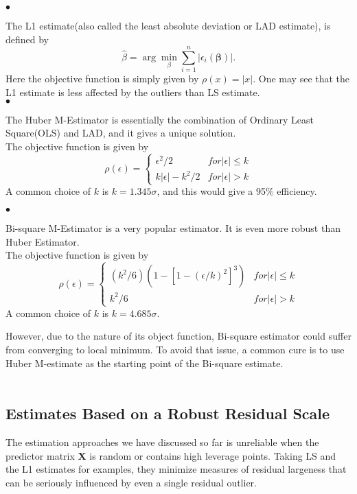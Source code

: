 \documentclass[conference]{IEEEtran}
\begin{document}
\noindent $\bullet$ 

The L1 estimate(also called the least absolute deviation or LAD estimate), is defined by 
$$\hat{\beta} = \arg \min_{\beta} \sum_{i=1}^{n} | \epsilon_{i}(\mathbold{\beta})|.$$ Here the objective function is simply given by $\rho(x) = |x|$. One may see that the L1 estimate is less affected by the outliers than LS estimate.\\


\noindent $\bullet$ 

The Huber M-Estimator is essentially the combination of Ordinary Least Square(OLS) and LAD, and it gives a unique solution. \\
The objective function is given by 
$$\rho(\epsilon) =\begin{cases}\epsilon^2/2 & for\left|\epsilon\right| \leq k\\k\left|\epsilon\right| - k^2/2 & for\left|\epsilon\right| > k\end{cases}$$
A common choice of $k$ is $k = 1.345\sigma$, and this would give a 95\% efficiency.

\noindent $\bullet$ 

Bi-square M-Estimator is a very popular estimator. It is even more robust than Huber Estimator. \\
The objective function is given by
$$\rho(\epsilon) =\begin{cases}(k^2/6)(1-[1-(\epsilon/k)^2]^3) & for\left|\epsilon\right| \leq k\\k^2/6 & for\left|\epsilon\right| > k\end{cases}$$
A common choice of $k$ is $k = 4.685\sigma$.

However, due to the nature of its object function, Bi-square estimator could suffer from converging to local minimum. To avoid that issue, a common cure is to use Huber M-estimate as the starting point of the Bi-square estimate. \\~


\subsection{Estimates Based on a Robust Residual Scale}

The estimation approaches we have discussed so far is unreliable when the predictor matrix $\mathbold{X}$ is random or contains high leverage points. Taking LS and the L1 estimates for examples, they minimize measures of residual largeness that can be seriously influenced by even a single residual outlier. 
\end{document}
